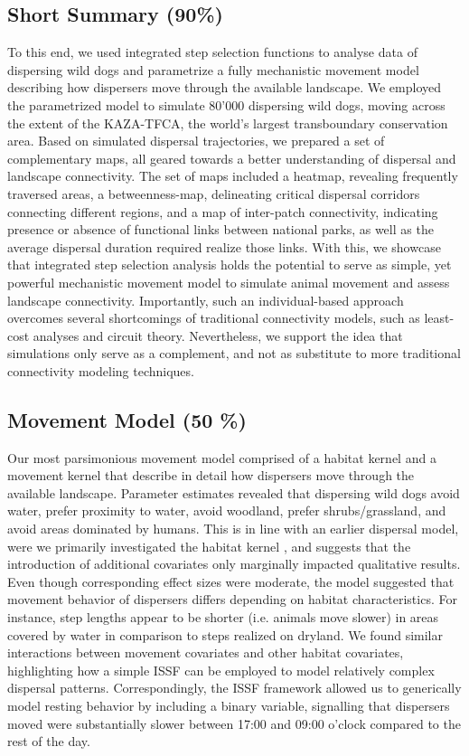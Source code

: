\documentclass[abstract=on,10pt,a4paper,bibliography=totocnumbered]{article}
\begin{document}
\subsection{Short Summary (90\%)}
To this end, we used integrated step selection functions to analyse data of
dispersing wild dogs and parametrize a fully mechanistic movement model
describing how dispersers move through the available landscape. We employed the
parametrized model to simulate 80'000 dispersing wild dogs, moving across the
extent of the KAZA-TFCA, the world's largest transboundary conservation area.
Based on simulated dispersal trajectories, we prepared a set of complementary
maps, all geared towards a better understanding of dispersal and landscape
connectivity. The set of maps included a heatmap, revealing frequently traversed
areas, a betweenness-map, delineating critical dispersal corridors connecting
different regions, and a map of inter-patch connectivity, indicating presence or
absence of functional links between national parks, as well as the average
dispersal duration required realize those links. With this, we showcase that
integrated step selection analysis holds the potential to serve as simple, yet
powerful mechanistic movement model to simulate animal movement and assess
landscape connectivity. Importantly, such an individual-based approach overcomes
several shortcomings of traditional connectivity models, such as least-cost
analyses and circuit theory. Nevertheless, we support the idea that simulations
only serve as a complement, and not as substitute to more traditional
connectivity modeling techniques.

\subsection{Movement Model (50 \%)}
Our most parsimonious movement model comprised of a habitat kernel and a
movement kernel that describe in detail how dispersers move through the
available landscape. Parameter estimates revealed that dispersing wild dogs
avoid water, prefer proximity to water, avoid woodland, prefer shrubs/grassland,
and avoid areas dominated by humans. This is in line with an earlier dispersal
model, were we primarily investigated the habitat kernel \cite{Hofmann.2021},
and suggests that the introduction of additional covariates only marginally
impacted qualitative results. Even though corresponding effect sizes were
moderate, the model suggested that movement behavior of dispersers differs
depending on habitat characteristics. For instance, step lengths appear to be
shorter (i.e. animals move slower) in areas covered by water in comparison to
steps realized on dryland. We found similar interactions between movement
covariates and other habitat covariates, highlighting how a simple ISSF can be
employed to model relatively complex dispersal patterns. Correspondingly, the
ISSF framework allowed us to generically model resting behavior by including a
binary variable, signalling that dispersers moved were substantially slower
between 17:00 and 09:00 o'clock compared to the rest of the day.
\end{document}
